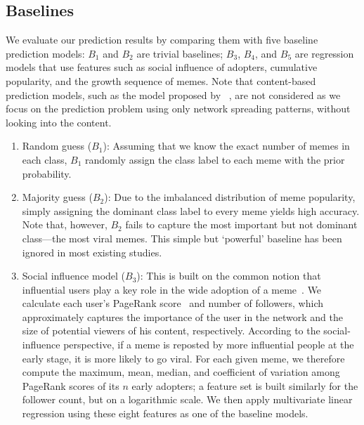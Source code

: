 \documentclass[letterpaper]{article}
\begin{document}
\subsection{Baselines}

We evaluate our prediction results by comparing them with five baseline prediction models: $B_1$ and $B_2$ are trivial baselines; $B_3$, $B_4$, and $B_5$ are regression models that use features such as social influence of adopters, cumulative popularity, and the growth sequence of memes. Note that content-based prediction models, such as the model proposed by \citeauthor{tsur2012wsdm}~, are not considered as we focus on the prediction problem using only network spreading patterns, without looking into the content.

\begin{enumerate}

\item Random guess ($B_1$): Assuming that we know the exact number of memes in
    each class, $B_1$ randomly assign the class label to each meme with the prior
    probability.

\item Majority guess ($B_2$): Due to the imbalanced distribution of meme
    popularity, simply assigning the dominant class label to every meme yields
    high accuracy. Note that, however, $B_2$ fails to capture the most important
    but not dominant class---the most viral memes.  This simple but `powerful'
    baseline has been ignored in most existing studies.


\item Social influence model ($B_3$):
This is built on the common notion that influential users play a key role in the wide adoption of a meme~\cite{Kitsak2010kcore,cha2010measuring,Suh2010,bakshy_everyones_2011}.
We calculate each user's PageRank score~\cite{brin1998anatomy} and number of followers, which approximately captures the importance of the user in the network and the size of potential viewers of his content, respectively. %
 According to the social-influence perspective, if a meme is reposted by more influential people at the early stage, it is more likely to go viral.
For each given meme, we therefore compute the maximum, mean, median, and coefficient of
variation among PageRank scores of its $n$ early adopters; a feature set is built similarly for the follower count, but on a logarithmic scale. We then apply multivariate linear regression using these eight features as one of the baseline models.


\end{enumerate}
\end{document}

